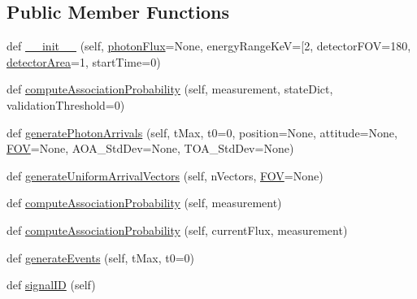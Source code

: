 \subsection*{Public Member Functions}
\begin{DoxyCompactItemize}
\item 
def \hyperlink{classmodest_1_1signals_1_1uniformnoisexraysource_1_1UniformNoiseXRaySource_a123b4289c31ce2a595aef68bc940de32}{\+\_\+\+\_\+init\+\_\+\+\_\+} (self, \hyperlink{classmodest_1_1signals_1_1uniformnoisexraysource_1_1UniformNoiseXRaySource_a0f958a631c21f5e56d09e1906a50aa18}{photon\+Flux}=None, energy\+Range\+KeV=\mbox{[}2, detector\+F\+OV=180, \hyperlink{classmodest_1_1signals_1_1uniformnoisexraysource_1_1UniformNoiseXRaySource_a77090ba977ae75035e7d17b1ae458944}{detector\+Area}=1, start\+Time=0)
\item 
def \hyperlink{classmodest_1_1signals_1_1uniformnoisexraysource_1_1UniformNoiseXRaySource_a86a50661bf02e8ca9ffc9df881cc1787}{compute\+Association\+Probability} (self, measurement, state\+Dict, validation\+Threshold=0)
\item 
def \hyperlink{classmodest_1_1signals_1_1uniformnoisexraysource_1_1UniformNoiseXRaySource_a40278f1d8d3399df6dd86f23e55852b7}{generate\+Photon\+Arrivals} (self, t\+Max, t0=0, position=None, attitude=None, \hyperlink{classmodest_1_1signals_1_1uniformnoisexraysource_1_1UniformNoiseXRaySource_a7cfd254af9003d98214119e5d11f226e}{F\+OV}=None, A\+O\+A\+\_\+\+Std\+Dev=None, T\+O\+A\+\_\+\+Std\+Dev=None)
\item 
def \hyperlink{classmodest_1_1signals_1_1uniformnoisexraysource_1_1UniformNoiseXRaySource_ad4c8ce337443a66977e4d2b296ae5e30}{generate\+Uniform\+Arrival\+Vectors} (self, n\+Vectors, \hyperlink{classmodest_1_1signals_1_1uniformnoisexraysource_1_1UniformNoiseXRaySource_a7cfd254af9003d98214119e5d11f226e}{F\+OV}=None)
\item 
def \hyperlink{classmodest_1_1signals_1_1poissonsource_1_1StaticPoissonSource_a1754d94bff46d97817438bab552afef9}{compute\+Association\+Probability} (self, measurement)
\item 
def \hyperlink{classmodest_1_1signals_1_1poissonsource_1_1PoissonSource_a2f8a73e6f51cbdcd0f1e646d6f4d4574}{compute\+Association\+Probability} (self, current\+Flux, measurement)
\item 
def \hyperlink{classmodest_1_1signals_1_1poissonsource_1_1StaticPoissonSource_acc0f087c93d5e90070f4cd0be95ace74}{generate\+Events} (self, t\+Max, t0=0)
\item 
def \hyperlink{classmodest_1_1signals_1_1signalsource_1_1SignalSource_a9a64c6a9c2954f6ad61e4ca3518ea8ab}{signal\+ID} (self)
\end{DoxyCompactItemize}
